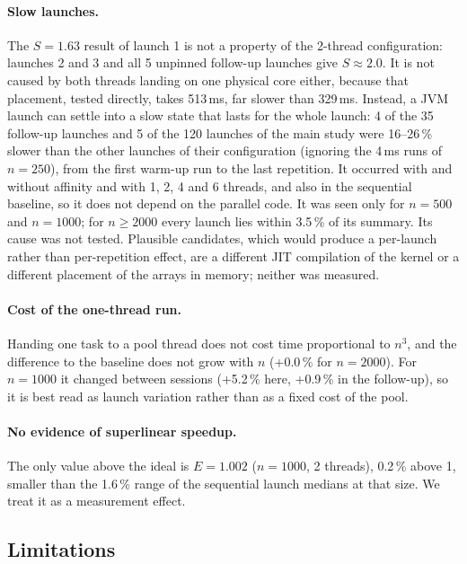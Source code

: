 \documentclass[11pt,a4paper]{article}
\begin{document}
\paragraph{Slow launches.} The $S = 1.63$ result of launch 1 is not a property of the 2-thread configuration: launches 2 and 3 and all 5 unpinned follow-up launches give $S \approx 2.0$. It is not caused by both threads landing on one physical core either, because that placement, tested directly, takes 513\,ms, far slower than 329\,ms. Instead, a JVM launch can settle into a slow state that lasts for the whole launch: 4 of the 35 follow-up launches and 5 of the 120 launches of the main study were 16--26\,\% slower than the other launches of their configuration (ignoring the 4\,ms runs of $n = 250$), from the first warm-up run to the last repetition. It occurred with and without affinity and with 1, 2, 4 and 6 threads, and also in the sequential baseline, so it does not depend on the parallel code. It was seen only for $n = 500$ and $n = 1000$; for $n \ge 2000$ every launch lies within 3.5\,\% of its summary. Its cause was not tested. Plausible candidates, which would produce a per-launch rather than per-repetition effect, are a different JIT compilation of the kernel or a different placement of the arrays in memory; neither was measured.

\paragraph{Cost of the one-thread run.} Handing one task to a pool thread does not cost time proportional to $n^3$, and the difference to the baseline does not grow with $n$ (+0.0\,\% for $n = 2000$). For $n = 1000$ it changed between sessions (+5.2\,\% here, +0.9\,\% in the follow-up), so it is best read as launch variation rather than as a fixed cost of the pool.

\paragraph{No evidence of superlinear speedup.} The only value above the ideal is $E = 1.002$ ($n = 1000$, 2 threads), 0.2\,\% above 1, smaller than the 1.6\,\% range of the sequential launch medians at that size. We treat it as a measurement effect.

\subsection{Limitations}
\end{document}
